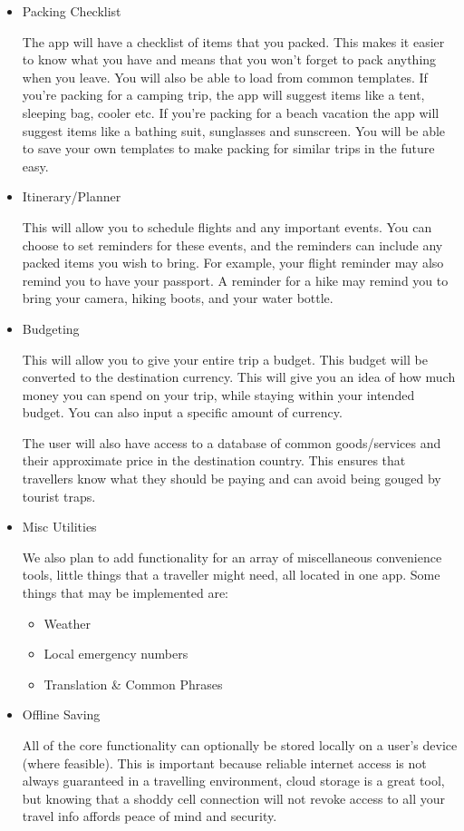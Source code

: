 \documentclass[12pt]{article}
\begin{document}
	\begin{itemize}

		\item{Packing Checklist}

		The app will have a checklist of items that you packed.
		This makes it easier to know what you have and means that you won't forget to pack anything when you leave.
		You will also be able to load from common templates.
		If you're packing for a camping trip, the app will suggest items like a tent, sleeping bag, cooler etc.
		If you're packing for a beach vacation the app will suggest items like a bathing suit, sunglasses and sunscreen.
		You will be able to save your own templates to make packing for similar trips in the future easy.

		\item{Itinerary/Planner}

		This will allow you to schedule flights and any important events.
		You can choose to set reminders for these events, and the reminders can include any packed items you wish to bring.
		For example, your flight reminder may also remind you to have your passport.
		A reminder for a hike may remind you to bring your camera, hiking boots, and your water bottle.

		\item{Budgeting}

		This will allow you to give your entire trip a budget.
		This budget will be converted to the destination currency.
		This will give you an idea of how much money you can spend on your trip,
		while staying within your intended budget.
		You can also input a specific amount of currency.

		The user will also have access to a database of common goods/services and their approximate price in the destination country.
		This ensures that travellers know what they should be paying and can avoid being gouged by tourist traps.

		\item{Misc Utilities}

		We also plan to add functionality for an array of miscellaneous convenience tools,
		little things that a traveller might need, all located in one app.
		Some things that may be implemented are:

		\begin{itemize}
			\item Weather
			\item Local emergency numbers
			\item Translation \& Common Phrases
		\end{itemize}

		\item{Offline Saving}

		All of the core functionality can optionally be stored locally on a user's device (where feasible).
		This is important because reliable internet access is not always guaranteed in a travelling environment,
		cloud storage is a great tool, but knowing that a shoddy cell connection will not revoke access to all your
		travel info affords peace of mind and security.

	\end{itemize}
\end{document}
